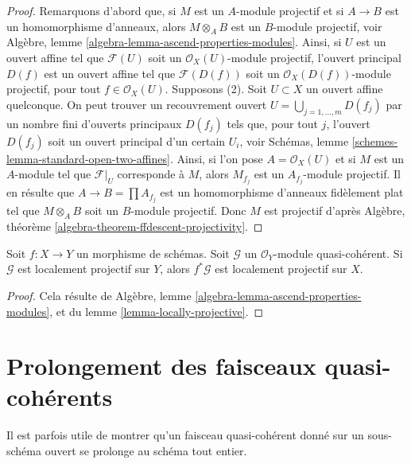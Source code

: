 \begin{proof}
Remarquons d'abord que, si $M$ est un $A$-module projectif et si $A \to B$ est un
homomorphisme d'anneaux, alors $M \otimes_A B$ est un $B$-module projectif,
voir Algèbre, lemme \ref{algebra-lemma-ascend-properties-modules}.
Ainsi, si $U$ est un ouvert affine tel que $\mathcal{F}(U)$ soit un
$\mathcal{O}_X(U)$-module projectif, l'ouvert principal $D(f)$ est
un ouvert affine tel que $\mathcal{F}(D(f))$ soit un
$\mathcal{O}_X(D(f))$-module projectif, pour tout $f \in \mathcal{O}_X(U)$.
Supposons (2). Soit $U \subset X$ un ouvert affine quelconque. On
peut trouver un recouvrement ouvert $U = \bigcup_{j = 1, \ldots, m} D(f_j)$
par un nombre fini d'ouverts principaux $D(f_j)$ tels que, pour tout
$j$, l'ouvert $D(f_j)$ soit un ouvert principal d'un certain $U_i$, voir
Schémas, lemme \ref{schemes-lemma-standard-open-two-affines}.
Ainsi, si l'on pose $A = \mathcal{O}_X(U)$ et si $M$ est un $A$-module
tel que $\mathcal{F}|_U$ corresponde à $M$, alors
$M_{f_j}$ est un $A_{f_j}$-module projectif. Il en résulte que
$A \to B = \prod A_{f_j}$ est un homomorphisme d'anneaux fidèlement
plat tel que $M \otimes_A B$ soit un $B$-module
projectif. Donc $M$ est projectif
d'après Algèbre, théorème \ref{algebra-theorem-ffdescent-projectivity}.
\end{proof}

\begin{lemma}
\label{lemma-locally-projective-pullback}
Soit $f : X \to Y$ un morphisme de schémas.
Soit $\mathcal{G}$ un $\mathcal{O}_Y$-module
quasi-cohérent. Si $\mathcal{G}$ est localement projectif sur $Y$, alors $f^*\mathcal{G}$
est localement projectif sur $X$.
\end{lemma}

\begin{proof}
Cela résulte
de Algèbre, lemme \ref{algebra-lemma-ascend-properties-modules},
et du lemme \ref{lemma-locally-projective}.
\end{proof}






\section{Prolongement des faisceaux quasi-cohérents}
\label{section-extending-quasi-coherent-sheaves}

\noindent
Il est parfois utile de montrer qu'un faisceau quasi-cohérent donné sur
un sous-schéma ouvert se prolonge au schéma tout entier.

